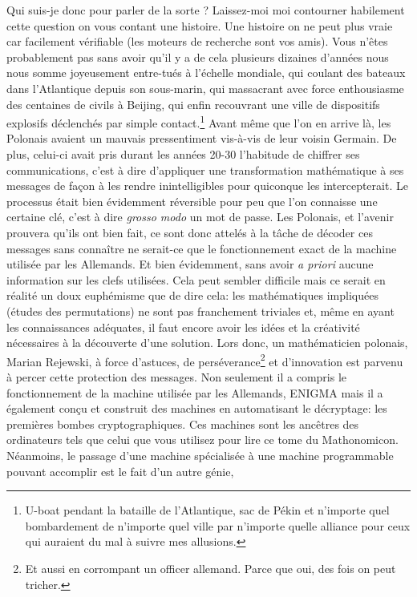 Qui suis-je donc pour parler de la sorte ? Laissez-moi moi contourner
habilement cette question on vous contant une histoire. Une histoire
on ne peut plus vraie car facilement vérifiable (les moteurs de
recherche sont vos amis). Vous n'êtes probablement pas sans avoir
qu'il y a de cela plusieurs dizaines d'années nous nous somme
joyeusement entre-tués à l'échelle mondiale, qui coulant des bateaux
dans l'Atlantique depuis son sous-marin, qui massacrant avec force
enthousiasme des centaines de civils à Beijing, qui enfin recouvrant
une ville de dispositifs explosifs déclenchés par simple
contact.\footnote{U-boat pendant la bataille de l'Atlantique, sac de
  Pékin et n'importe quel bombardement de n'importe quel ville par
  n'importe quelle alliance pour ceux qui auraient du mal à suivre mes
  allusions.} Avant même que l'on en arrive là, les Polonais avaient
un mauvais pressentiment vis-à-vis de leur voisin Germain. De plus,
celui-ci avait pris durant les années 20-30 l'habitude de chiffrer ses
communications, c'est à dire d'appliquer une transformation
mathématique à ses messages de façon à les rendre inintelligibles pour
quiconque les intercepterait. Le processus était bien évidemment
réversible pour peu que l'on connaisse une certaine clé, c'est à dire
\emph{grosso modo} un mot de passe. Les Polonais, et l'avenir prouvera
qu'ils ont bien fait, ce sont donc attelés à la tâche de décoder ces
messages sans connaître ne serait-ce que le fonctionnement exact de la
machine utilisée par les Allemands. Et bien évidemment, sans avoir
\emph{a priori} aucune information sur les clefs utilisées. Cela peut
sembler difficile mais ce serait en réalité un doux euphémisme que de
dire cela: les mathématiques impliquées (études des permutations) ne
sont pas franchement triviales et, même en ayant les connaissances
adéquates, il faut encore avoir les idées et la créativité nécessaires
à la découverte d'une solution. Lors donc, un mathématicien polonais,
Marian Rejewski, à force d'astuces, de perséverance\footnote{Et aussi
  en corrompant un officer allemand. Parce que oui, des fois on peut
  tricher.} et d'innovation est parvenu à percer cette protection des
messages. Non seulement il a compris le fonctionnement de la machine
utilisée par les Allemands, ENIGMA mais il a également conçu et
construit des machines en automatisant le décryptage: les premières
bombes cryptographiques. Ces machines sont les ancêtres des
ordinateurs tels que celui que vous utilisez pour lire ce tome du
Mathonomicon. Néanmoins, le passage d'une machine spécialisée à une
machine programmable pouvant accomplir est le fait d'un autre génie,
